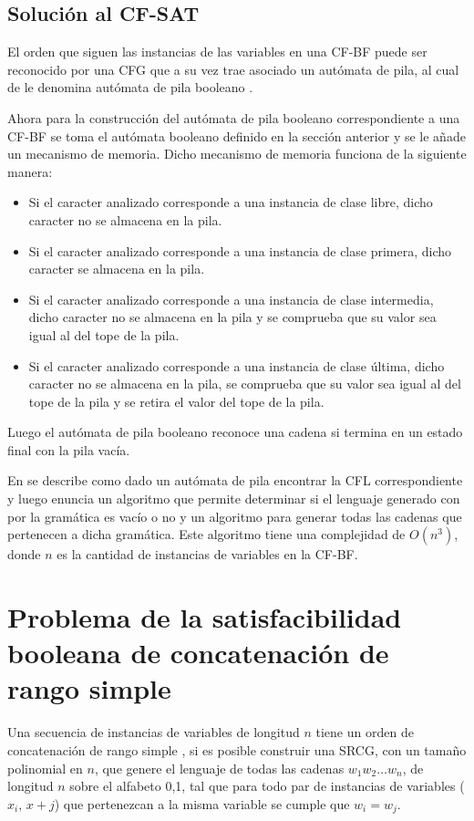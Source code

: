 \documentclass{article}
\begin{document}
\subsection{Solución al CF-SAT}

El orden que siguen las instancias de las variables en una CF-BF puede ser reconocido por una CFG que a su vez trae asociado
un autómata de pila, al cual de le denomina autómata de pila booleano \cite{aCFSAT}.

Ahora para la construcción del autómata de pila booleano correspondiente a una CF-BF se toma el autómata booleano definido en
la sección anterior y se le añade un mecanismo de memoria. Dicho mecanismo de memoria funciona de la siguiente manera:

\begin{itemize}
      \item Si el caracter analizado corresponde a una instancia de clase libre, dicho caracter no se almacena en la pila.
      \item Si el caracter analizado corresponde a una instancia de clase primera, dicho caracter se almacena en la pila.
      \item Si el caracter analizado corresponde a una instancia de clase intermedia, dicho caracter no se almacena en la
            pila y se comprueba que su valor sea igual al del tope de la pila.
      \item Si el caracter analizado corresponde a una instancia de clase última, dicho caracter no se almacena en la
            pila, se comprueba que su valor sea igual al del tope de la pila y se retira el valor del tope de la pila.
\end{itemize}
Luego el autómata de pila booleano reconoce una cadena si termina en un estado final con la pila vacía.

En \cite{aCFSAT} se describe como dado un autómata de pila encontrar la CFL correspondiente y luego enuncia un
algoritmo que permite determinar si el lenguaje generado con por la gramática es vacío o no y un algoritmo para
generar todas las cadenas que pertenecen a dicha gramática. Este algoritmo tiene una complejidad de $O(n^3)$, donde $n$
es la cantidad de instancias de variables en la CF-BF.

\section{Problema de la satisfacibilidad booleana de concatenación de rango simple}

Una secuencia de instancias de variables de longitud $n$ tiene un orden de concatenación de rango simple \cite{aSRCSAT},
si es posible construir una SRCG, con un tamaño polinomial en $n$, que genere el lenguaje de todas las cadenas
$w_1w_2 \ldots w_n$, de longitud $n$ sobre el alfabeto {0,1}, tal que para todo par de instancias de variables
($x_i$, $x+j$) que pertenezcan a la misma variable se cumple que $w_i = w_j$.
\end{document}
